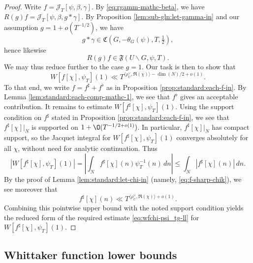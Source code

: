 \begin{proof}
  Write $f = \mathcal{J}_T[\psi, \beta, \gamma]$.  By \eqref{eq:rgamm-mathc-beta}, we have $R(g) f = \mathcal{J}_T[\psi,\beta, g \ast \gamma]$.  By Proposition \ref{lem:sub-gln:let-gamma-in} and our assumption $g = 1 + o(T^{-1/2})$, we have
  \begin{equation*}
    g \ast \gamma \in \mathfrak{C}(G,-\theta_G(\psi),T,\tfrac{1}{2}),
  \end{equation*}
  hence likewise
  \begin{equation*}
    R(g) f \in \mathfrak{F}(U \backslash G, \psi, T).
  \end{equation*}
  We may thus reduce further to the case $g = 1$.  Our task is then to show that
  \begin{equation*}
    W[f[\chi], \psi_T](1)
    \ll T^{\langle \rho_U^\vee, \Re(\chi) \rangle - \dim(N)/2 + o(1)}.
  \end{equation*}
  To that end, we write $f = f^\sharp + f^\flat$ as in Proposition \ref{prop:standard:each-f-in}.  By Lemma \ref{lem:standard:each-comp-mathc-1}, we see that $f^\flat$ gives an acceptable contribution.  It remains to estimate $W [f^\sharp [\chi ], \psi_T ] (1)$.  Using the support condition on $f^\sharp$ stated in Proposition \ref{prop:standard:each-f-in}, we see that $f^\sharp [\chi ]|_{N}$ is supported on $1 + \O(T^{-1/2+o(1)})$.
  In particular, $f^\sharp [\chi ]|_{N}$ has compact support, so the Jacquet integral for $W [f^\sharp [\chi ], \psi_T ] (1)$ converges absolutely for all $\chi$, without need for analytic continuation.  Thus
  \begin{equation*}
    |W[f^\sharp [\chi],\psi_T](1)|
    =
    \left\lvert
      \int_N f^\sharp [\chi](n) \psi_T^{-1}(n) \, d n
    \right\rvert
    \leq
    \int_{N} |f^\sharp [\chi](n)| \, d n.
  \end{equation*}
  By the proof of Lemma \ref{lem:standard:let-chi-in} (namely, \eqref{eq:f-sharp-chik}), we see moreover that
  \begin{equation*}
    f^\sharp [\chi](n) \ll  T^{\langle \rho_U^\vee , \Re(\chi) \rangle + o(1)}.
  \end{equation*}
  Combining this pointwise upper bound with the noted support condition yields the reduced form of the required estimate \eqref{eq:wfchi-psi_tg-ll} for $W[f^\sharp [\chi],\psi_T](1)$.
\end{proof}


\subsection{Whittaker function lower bounds}\label{sec:whitt-funct-lower}

